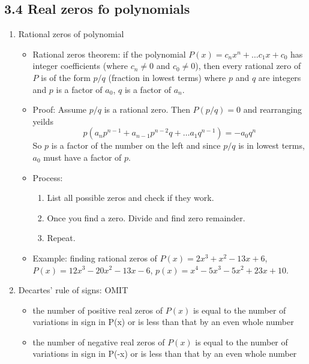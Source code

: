\documentclass{article}
\begin{document}
\subsection{3.4 Real zeros fo polynomials}

\begin{enumerate}
\item Rational zeros of polynomial
\begin{itemize}

\item Rational zeros theorem: if the polynomial $P(x)=c_nx^n + \dots c_1x + c_0$ has integer coefficients (where $c_n\neq 0$ and $c_0 \neq 0$), then every rational zero of $P$ is of the form $p/q$ (fraction in lowest terms)
where $p$ and $q$ are integers and $p$ is a factor of $a_0$, $q$ is a factor of $a_n$.
\item Proof: Assume $p/q$ is a rational zero. Then $P(p/q)=0$ and rearranging yeilds
\[
p(a_np^{n-1} + a_{n-1}p^{n-2}q +  \dots a_1 q^{n-1}) = -a_0q^n
\]
So $p$ is a factor of the number on the left and since $p/q$ is in lowest terms, $a_0$ must have a factor of $p$.

\item Process: 
\begin{enumerate}
\item List all possible zeros and check if they work. 
\item Once you find a zero. Divide and find zero remainder.
\item Repeat.
\end{enumerate}
\item Example: finding rational zeros of $P(x) = 2x^3 + x^2 -13x + 6$, $P(x)=12x^3-20x^2-13x-6$, $p(x)=x^4-5x^3-5x^2+23x+10$.
\end{itemize}

\item Decartes' rule of signs: OMIT
\begin{itemize}
\item the number of positive real zeros of $P(x)$ is equal to the number of variations in sign in P(x) or is less than that by an even whole number
\item the number of negative real zeros of $P(x)$ is equal to the number of variations in sign in P(-x) or is less than that by an even whole number
\end{itemize}


\end{enumerate}
\end{document}
